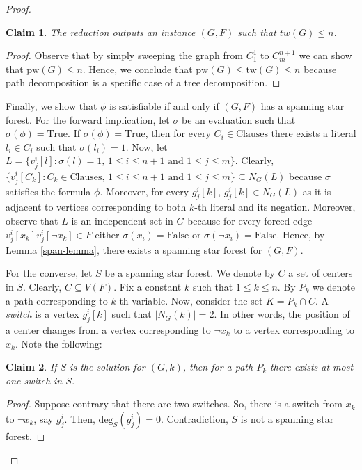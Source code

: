 \documentclass[en]{pracamgr}
\newtheorem{claim}{Claim}
\theoremstyle{definition}
\newcommand{\degree}[2]{\textrm{deg}_{#1}(#2)}
\newcommand{\true}{\textrm{True}}
\newcommand{\false}{\textrm{False}}
\begin{document}
\begin{proof}
	\begin{claim}
		The reduction outputs an instance $(G,F)$ such that $tw(G) \leq n$.
	\end{claim}

	\begin{proof}
		Observe that by simply sweeping the graph from $C^1_1$ to $C^{n+1}_m$ we can show that $\textrm{pw}(G) \leq n$. Hence, we conclude that $\textrm{pw}(G) \leq \textrm{tw}(G) \leq n$ because path decomposition is a specific case of a tree decomposition.
	\end{proof}
	
	Finally, we show that $\phi$ is satisfiable if and only if $(G,F)$ has a spanning star forest. For the forward implication, let $\sigma$ be an evaluation such that $\sigma(\phi)=\true$. If $\sigma(\phi)=\textrm{True}$, then for every $C_i \in \textrm{Clauses}$ there exists a literal $l_i \in C_i$ such that $\sigma(l_i)=1$. Now, let $L = \{v^i_j[l]: \sigma(l)=1\text{, } 1 \leq i \leq n+1 \text{ and } 1 \leq j \leq m\}$. Clearly, $\{v^i_j[C_k]: C_k \in \textrm{Clauses} \text{, } 1 \leq i \leq n+1 \text{ and } 1 \leq j \leq m\} \subseteq N_G(L)$ because $\sigma$ satisfies the formula $\phi$. Moreover, for every $g^i_j[k]$, $g^i_j[k] \in N_G(L)$ as it is adjacent to vertices corresponding to both $k$-th literal and its negation. Moreover, observe that $L$ is an independent set in $G$ because for every forced edge $v^i_j[x_k]v^i_j[\neg x_k] \in F$ either $\sigma(x_i)=\false$ or $\sigma(\neg x_i)=\false$. Hence, by Lemma \ref{span-lemma}, there exists a spanning star forest for $(G,F)$.
	
	For the converse, let $S$ be a spanning star forest. We denote by $C$ a set of centers in $S$. Clearly, $C \subseteq V(F)$. Fix a constant $k$ such that $1 \leq k \leq n$. By $P_k$ we denote a path corresponding to $k$-th variable. Now, consider the set $K = P_k \cap C$. A \textit{switch} is a vertex $g^i_j[k]$ such that $|N_G(k)|=2$. In other words, the position of a center changes from a vertex corresponding to $\neg x_k$ to a vertex corresponding to $x_k$. Note the following:
	
	\begin{claim}
		If $S$ is the solution for $(G,k)$, then for a path $P_k$ there exists at most one switch in $S$.
	\end{claim}

	\begin{proof}
		Suppose contrary that there are two switches. So, there is a switch from $x_k$ to $\neg x_k$, say $g^i_j$. Then, $\degree{S}{g^i_j}=0$. Contradiction, $S$ is not a spanning star forest.
	\end{proof}


\end{proof}
\end{document}
